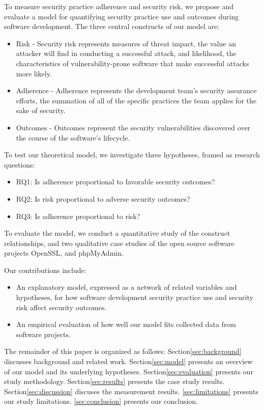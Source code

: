 To measure security practice adherence and security risk, we propose and evaluate a model for quantifying security practice use and outcomes during software development. The three central constructs of our model are:
\begin{itemize}
\item Risk - Security risk represents measures of threat impact, the value an attacker will find in conducting a successful attack, and likelihood, the characteristics of vulnerability-prone software that make successful attacks more likely.
\item Adherence - Adherence represents the development team’s security assurance efforts, the summation of all of the specific practices the team applies for the sake of security. 
\item Outcomes - Outcomes represent the security vulnerabilities discovered over the course of the software’s lifecycle.
\end{itemize}
To test our theoretical model, we investigate three hypotheses, framed as research questions:
\begin{itemize}
\item RQ1: Is adherence proportional to favorable security outcomes?
\item RQ2: Is risk proportional to adverse security outcomes?
\item RQ3: Is adherence proportional to risk?
\end{itemize}

To evaluate the model, we conduct a quantitative study of the construct relationships, and two qualitative case studies of the open source software projects OpenSSL, and phpMyAdmin.
  
Our contributions include:
\begin{itemize}
\item An explanatory model, expressed as a network of related variables and hypotheses, for how software development security practice use and security risk affect security outcomes.
\item An empirical evaluation of how well our model fits collected data from software projects. 
\end{itemize}
The remainder of this paper is organized as follows:  Section\ref{sec:background} discusses background and related work. Section\ref{sec:model} presents an overview of our model and its underlying hypotheses. Section\ref{sec:evaluation} presents our study methodology. Section\ref{sec:results} presents the case study results. Section\ref{sec:discussion} discuses the measurement results. \ref{sec:limitations} presents our study limitations. \ref{sec:conclusion} presents our conclusion.
